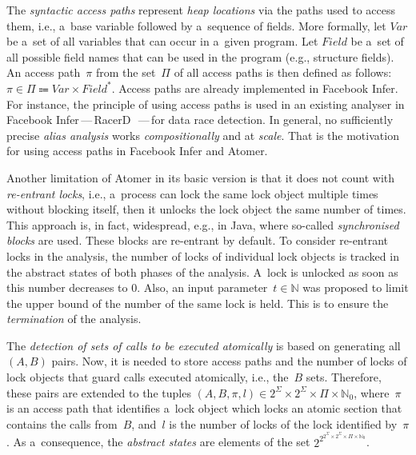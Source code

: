 \documentclass{ExcelAtFIT}
\theoremstyle{definition}
\begin{document}
The \emph{syntactic access paths} represent \emph{heap locations} via the paths used to access them, i.e., a~base variable followed by a~sequence of fields. More formally, let $ Var $ be a~set of all variables that can occur in a~given program. Let $ Field $ be a~set of all possible field names that can be used in the program (e.g., structure fields). An access path~$ \pi $ from the set~$ \Pi $ of all access paths is then defined as follows: $ \pi \in \Pi \Coloneqq Var \times Field^* $. Access paths are already implemented in Facebook Infer. For instance, the principle of using access paths is used in an existing analyser in Facebook Infer\,---\,RacerD~\cite{racerD}\,---\,for data race detection. In general, no sufficiently precise \emph{alias analysis} works \emph{compositionally} and at \emph{scale}. That is the motivation for using access paths in Facebook Infer and Atomer.

Another limitation of Atomer in its basic version is that it does not count with \emph{re-entrant locks}, i.e., a~process can lock the same lock object multiple times without blocking itself, then it unlocks the lock object the same number of times. This approach is, in fact, widespread, e.g., in Java, where so-called \emph{synchronised blocks} are used. These blocks are re-entrant by default. To consider re-entrant locks in the analysis, the number of locks of individual lock objects is tracked in the abstract states of both phases of the analysis. A~lock is unlocked as soon as this number decreases to 0. Also, an input parameter~$ t \in \mathbb{N} $ was proposed to limit the upper bound of the number of the same lock is held. This is to ensure the \emph{termination} of the analysis.

The \emph{detection of sets of calls to be executed atomically} is based on generating all ${ (A, B) }$ pairs. Now, it is needed to store access paths and the number of locks of lock objects that guard calls executed atomically, i.e., the~$ B $ sets. Therefore, these pairs are extended to the tuples $ {(A, B, \pi, l)} \in 2^\Sigma \times 2^\Sigma \times \Pi \times \mathbb{N}_0 $, where~$ \pi $ is an access path that identifies a~lock object which locks an atomic section that contains the calls from~$ B $, and~$ l $ is the number of locks of the lock identified by~$ \pi $. As a~consequence, the \emph{abstract states} are elements of the set $ 2^{2^{2^\Sigma \times 2^\Sigma \times \Pi \times \mathbb{N}_0}} $.
\end{document}
